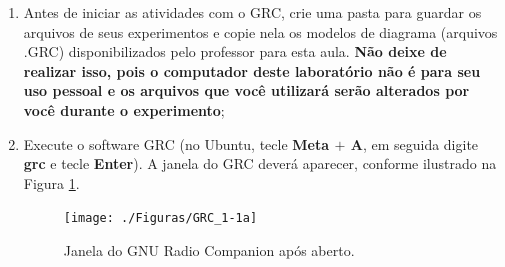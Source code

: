 \documentclass[12pt,addpoints]{exam}
\begin{document}
\begin{enumerate}
    \item Antes de iniciar as atividades com o GRC, crie uma pasta para guardar os arquivos de seus experimentos e copie nela os modelos de diagrama (arquivos .GRC) disponibilizados pelo professor para esta aula. \textbf{Não deixe de realizar isso, pois o computador deste laboratório não é para seu uso pessoal e os arquivos que você utilizará serão alterados por você durante o experimento};
    \item Execute o software GRC (no Ubuntu, tecle \textbf{Meta $+$ A}, em seguida digite \textbf{grc} e tecle \textbf{Enter}). A janela do GRC deverá aparecer, conforme ilustrado na Figura \ref{fig:GRC_1-1a}.
    \begin{figure}[htb]
        \centering
        \texttt{[image: ./Figuras/GRC\_1-1a]} \\
        \caption{Janela do GNU Radio Companion após aberto.} 
        \label{fig:GRC_1-1a}
    \end{figure}
  

\end{enumerate}
\end{document}
